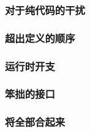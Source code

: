 \documentclass[./main.tex]{subfiles}
\begin{document}
\subsubsection*{对于纯代码的干扰}

\subsubsection*{超出定义的顺序}

\subsubsection*{运行时开支}

\subsubsection*{笨拙的接口}

\subsubsection*{将全部合起来}
\end{document}
